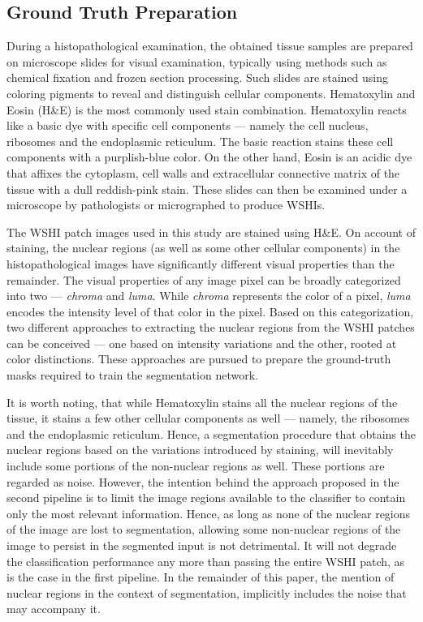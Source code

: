 \documentclass{comjnl}
\begin{document}
\subsection{Ground Truth Preparation}

During a histopathological examination, the obtained tissue samples are prepared on microscope slides for visual examination, typically using methods such as chemical fixation and frozen section processing. Such slides are stained using coloring pigments to reveal and distinguish cellular components. Hematoxylin and Eosin (H\&E) is the most commonly used stain combination. Hematoxylin reacts like a basic dye with specific cell components --- namely the cell nucleus, ribosomes and the endoplasmic reticulum. The basic reaction stains these cell components with a purplish-blue color. On the other hand, Eosin is an acidic dye that affixes the cytoplasm, cell walls and extracellular connective matrix of the tissue with a dull reddish-pink stain. These slides can then be examined under a microscope by pathologists or micrographed to produce WSHIs. 

The WSHI patch images used in this study are stained using H\&E. On account of staining, the nuclear regions (as well as some other cellular components) in the histopathological images have significantly different visual properties than the remainder. The visual properties of any image pixel can be broadly categorized into two --- \emph{chroma} and \emph{luma}. While \emph{chroma} represents the color of a pixel, \emph{luma} encodes the intensity level of that color in the pixel. Based on this categorization, two different approaches to extracting the nuclear regions from the WSHI patches can be conceived --- one based on intensity variations and the other, rooted at color distinctions. These approaches are pursued to prepare the ground-truth masks required to train the segmentation network. 

It is worth noting, that while Hematoxylin stains all the nuclear regions of the tissue, it stains a few other cellular components as well --- namely, the ribosomes and the endoplasmic reticulum.  Hence, a segmentation procedure that obtains the nuclear regions based on the variations introduced by staining, will inevitably include some portions of the non-nuclear regions as well. These portions are regarded as noise. However, the intention behind the approach proposed in the second pipeline is to limit the image regions available to the classifier to contain only the most relevant information. Hence, as long as none of the nuclear regions of the image are lost to segmentation, allowing some non-nuclear regions of the image to persist in the segmented input is not detrimental. It will not degrade the classification performance any more than passing the entire WSHI patch, as is the case in the first pipeline. In the remainder of this paper, the mention of nuclear regions in the context of segmentation, implicitly includes the noise that may accompany it. 
\end{document}
